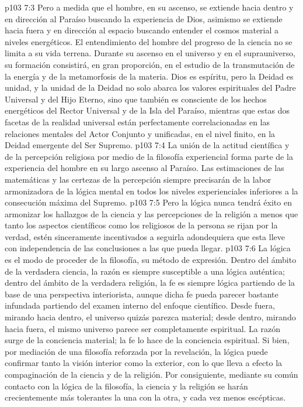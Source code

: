 \vs p103 7:3 Pero a medida que el hombre, en su ascenso, se extiende hacia dentro y en dirección al Paraíso buscando la experiencia de Dios, asimismo se extiende hacia fuera y en dirección al espacio buscando entender el cosmos material a niveles energéticos. El entendimiento del hombre del progreso de la ciencia no se limita a su vida terrena. Durante su ascenso en el universo y en el suprauniverso, su formación consistirá, en gran proporción, en el estudio de la transmutación de la energía y de la metamorfosis de la materia. Dios es espíritu, pero la Deidad es unidad, y la unidad de la Deidad no solo abarca los valores espirituales del Padre Universal y del Hijo Eterno, sino que también es consciente de los hechos energéticos del Rector Universal y de la Isla del Paraíso, mientras que estas dos facetas de la realidad universal están perfectamente correlacionadas en las relaciones mentales del Actor Conjunto y unificadas, en el nivel finito, en la Deidad emergente del Ser Supremo.
\vs p103 7:4 \pc La unión de la actitud científica y de la percepción religiosa por medio de la filosofía experiencial forma parte de la experiencia del hombre en su largo ascenso al Paraíso. Las estimaciones de las matemáticas y las certezas de la percepción siempre precisarán de la labor armonizadora de la lógica mental en todos los niveles experienciales inferiores a la consecución máxima del Supremo.
\vs p103 7:5 Pero la lógica nunca tendrá éxito en armonizar los hallazgos de la ciencia y las percepciones de la religión a menos que tanto los aspectos científicos como los religiosos de la persona se rijan por la verdad, estén sinceramente incentivados a seguirla adondequiera que esta lleve con independencia de las conclusiones a las que pueda llegar.
\vs p103 7:6 La lógica es el modo de proceder de la filosofía, su método de expresión. Dentro del ámbito de la verdadera ciencia, la razón es siempre susceptible a una lógica auténtica; dentro del ámbito de la verdadera religión, la fe es siempre lógica partiendo de la base de una perspectiva interiorista, aunque dicha fe pueda parecer bastante infundada partiendo del examen interno del enfoque científico. Desde fuera, mirando hacia dentro, el universo quizás parezca material; desde dentro, mirando hacia fuera, el mismo universo parece ser completamente espiritual. La razón surge de la conciencia material; la fe lo hace de la conciencia espiritual. Si bien, por mediación de una filosofía reforzada por la revelación, la lógica puede confirmar tanto la visión interior como la exterior, con lo que lleva a efecto la compaginación de la ciencia y de la religión. Por consiguiente, mediante su común contacto con la lógica de la filosofía, la ciencia y la religión se harán crecientemente más tolerantes la una con la otra, y cada vez menos escépticas.
